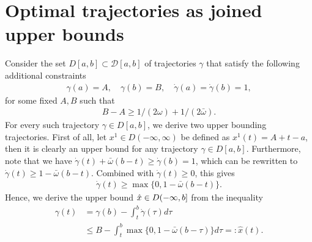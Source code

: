 \documentclass[a4paper]{article}
\theoremstyle{definition}
\theoremstyle{plain}
\begin{document}
\section{Optimal trajectories as joined upper bounds}

Consider the set $D[a,b] \subset \mathcal{D}[a, b]$ of trajectories
$\gamma$ that satisfy the following additional constraints
\begin{align}
  \gamma(a) = A, \quad \gamma(b) = B, \quad \dot{\gamma}(a) = \dot{\gamma}(b) = 1 ,
\end{align}
for some fixed $A, B$ such that
\begin{align}\label{eq:AB-assumption}
  B - A \geq 1/(2\omega) + 1/(2\bar{\omega}).
\end{align}
%
For every such trajectory $\gamma \in D[a,b]$, we derive two upper bounding
trajectories.
%
First of all, let $x^{1} \in D(-\infty, \infty)$ be defined as
$x^{1}(t) = A + t - a$, then it is clearly an upper bound for any trajectory
$\gamma \in D[a, b]$.
%
Furthermore, note that we have $\dot{\gamma}(t) + \bar{\omega} (b - t) \geq \dot{\gamma}(b) = 1$,
which can be rewritten to $\dot{\gamma}(t) \geq 1 - \bar{\omega} (b - t)$. Combined with
$\dot{\gamma}(t) \geq 0$, this gives
\begin{align}
  \dot{\gamma}(t) \geq \max \{ 0, 1 - \bar{\omega}(b - t) \} .
\end{align}
Hence, we derive the upper bound $\hat{x} \in D (-\infty,b]$ from the inequality
\begin{subequations}
\begin{align}
  \gamma(t) &= \gamma(b) - \int_{t}^{b} \dot{\gamma}(\tau) d \tau \\
  &\leq B - \int_{t}^{b} \max\{ 0, 1 -\bar{\omega} (b - \tau) \} d \tau =: \hat{x}(t) .
\end{align}
\end{subequations}
%
\end{document}
